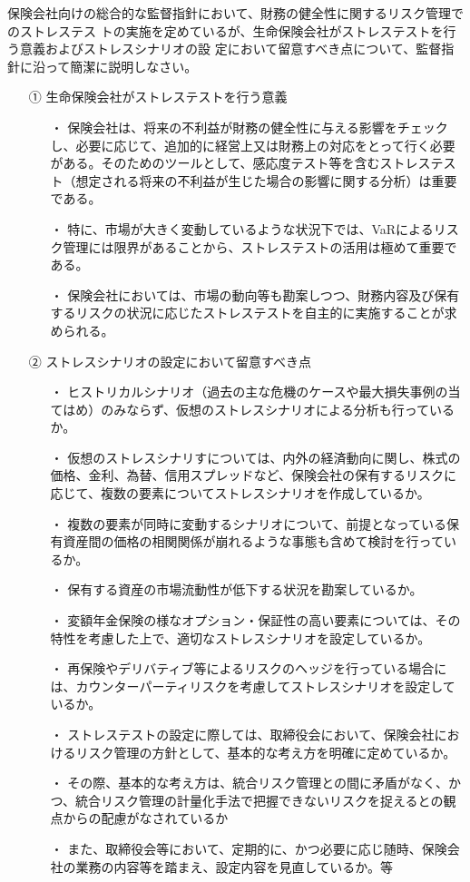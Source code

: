 \documentclass[report,gutter=10mm,fore-edge=10mm,uplatex,dvipdfmx]{jlreq}
\begin{document}
保険会社向けの総合的な監督指針において、財務の健全性に関するリスク管理でのストレステス
トの実施を定めているが、生命保険会社がストレステストを行う意義およびストレスシナリオの設
定において留意すべき点について、監督指針に沿って簡潔に説明しなさい。
\answer{}
\begin{itemize}
\item[①] 生命保険会社がストレステストを行う意義
\begin{itemize}
\item[・] 保険会社は、将来の不利益が財務の健全性に与える影響をチェックし、必要に応じて、追加的に経営上又は財務上の対応をとって行く必要がある。そのためのツールとして、感応度テスト等を含むストレステスト（想定される将来の不利益が生じた場合の影響に関する分析）は重要である。
\item[・] 特に、市場が大きく変動しているような状況下では、VaRによるリスク管理には限界があることから、ストレステストの活用は極めて重要である。
\item[・] 保険会社においては、市場の動向等も勘案しつつ、財務内容及び保有するリスクの状況に応じたストレステストを自主的に実施することが求められる。
\end{itemize}
\item[②] ストレスシナリオの設定において留意すべき点
\begin{itemize}
\item[・] ヒストリカルシナリオ（過去の主な危機のケースや最大損失事例の当てはめ）のみならず、仮想のストレスシナリオによる分析も行っているか。
\item[・] 仮想のストレスシナリすについては、内外の経済動向に関し、株式の価格、金利、為替、信用スプレッドなど、保険会社の保有するリスクに応じて、複数の要素についてストレスシナリオを作成しているか。
\item[・] 複数の要素が同時に変動するシナリオについて、前提となっている保有資産間の価格の相関関係が崩れるような事態も含めて検討を行っているか。
\item[・] 保有する資産の市場流動性が低下する状況を勘案しているか。
\item[・] 変額年金保険の様なオプション・保証性の高い要素については、その特性を考慮した上で、適切なストレスシナリオを設定しているか。
\item[・] 再保険やデリバティブ等によるリスクのヘッジを行っている場合には、カウンターパーティリスクを考慮してストレスシナリオを設定しているか。
\item[・] ストレステストの設定に際しては、取締役会において、保険会社におけるリスク管理の方針として、基本的な考え方を明確に定めているか。
\item[・] その際、基本的な考え方は、統合リスク管理との間に矛盾がなく、かつ、統合リスク管理の計量化手法で把握できないリスクを捉えるとの観点からの配慮がなされているか
\item[・] また、取締役会等において、定期的に、かつ必要に応じ随時、保険会社の業務の内容等を踏まえ、設定内容を見直しているか。等
\end{itemize}
\end{itemize}
\end{document}
